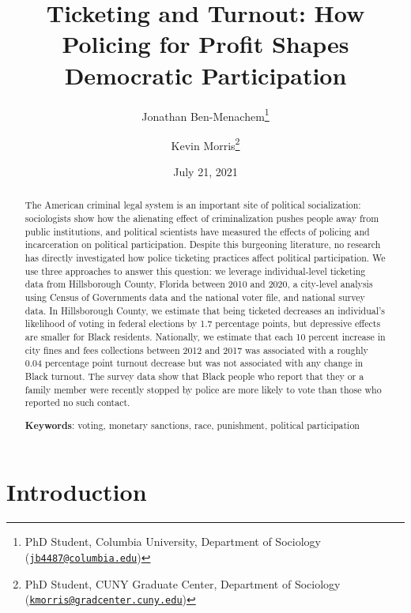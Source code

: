 \documentclass[
  12pt,
]{article}
\title{Ticketing and Turnout: How Policing for Profit Shapes Democratic Participation}
\author{Jonathan Ben-Menachem\footnote{PhD Student, Columbia University, Department of Sociology (\href{mailto:jb4487@columbia.edu}{\nolinkurl{jb4487@columbia.edu}})} \and Kevin Morris\footnote{PhD Student, CUNY Graduate Center, Department of Sociology (\href{mailto:kmorris@gradcenter.cuny.edu}{\nolinkurl{kmorris@gradcenter.cuny.edu}})}}
\date{July 21, 2021}
\begin{document}
\maketitle
\begin{abstract}
The American criminal legal system is an important site of political socialization: sociologists show how the alienating effect of criminalization pushes people away from public institutions, and political scientists have measured the effects of policing and incarceration on political participation. Despite this burgeoning literature, no research has directly investigated how police ticketing practices affect political participation. We use three approaches to answer this question: we leverage individual-level ticketing data from Hillsborough County, Florida between 2010 and 2020, a city-level analysis using Census of Governments data and the national voter file, and national survey data. In Hillsborough County, we estimate that being ticketed decreases an individual's likelihood of voting in federal elections by 1.7 percentage points, but depressive effects are smaller for Black residents. Nationally, we estimate that each 10 percent increase in city fines and fees collections between 2012 and 2017 was associated with a roughly 0.04 percentage point turnout decrease but was not associated with any change in Black turnout. The survey data show that Black people who report that they or a family member were recently stopped by police are more likely to vote than those who reported no such contact.

\hfill\break

\textbf{Keywords}: voting, monetary sanctions, race, punishment, political participation
\end{abstract}

\pagebreak

\doublespacing

\hypertarget{introduction}{%
\section*{Introduction}\label{introduction}}
\end{document}
